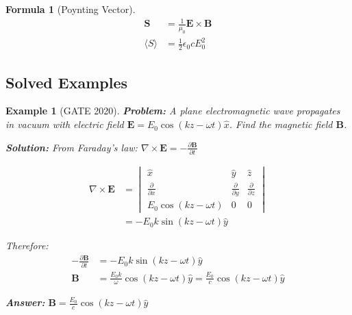 \documentclass[12pt,a4paper]{article}
\newtheorem{example}{Example}[section]
\newtheorem{formula}{Formula}[section]
\newcommand{\ans}[1]{\textcolor{red!70!black}{\textbf{Answer:} #1}}
\newcommand{\sol}{\textcolor{blue!70!black}{\textbf{Solution:}}}
\begin{document}
\begin{formula}[Poynting Vector]
\begin{align}
\mathbf{S} &= \frac{1}{\mu_0}\mathbf{E} \times \mathbf{B}\\
\langle S \rangle &= \frac{1}{2}\epsilon_0 c E_0^2
\end{align}
\end{formula}

\subsection{Solved Examples}

\begin{example}[GATE 2020]
\textbf{Problem:} A plane electromagnetic wave propagates in vacuum with electric field $\mathbf{E} = E_0 \cos(kz - \omega t)\hat{x}$. Find the magnetic field $\mathbf{B}$.

\sol
From Faraday's law: $\nabla \times \mathbf{E} = -\frac{\partial \mathbf{B}}{\partial t}$

\begin{align}
\nabla \times \mathbf{E} &= \begin{vmatrix}
\hat{x} & \hat{y} & \hat{z}\\
\frac{\partial}{\partial x} & \frac{\partial}{\partial y} & \frac{\partial}{\partial z}\\
E_0\cos(kz-\omega t) & 0 & 0
\end{vmatrix}\\
&= -E_0 k \sin(kz-\omega t)\hat{y}
\end{align}

Therefore:
\begin{align}
-\frac{\partial \mathbf{B}}{\partial t} &= -E_0 k \sin(kz-\omega t)\hat{y}\\
\mathbf{B} &= \frac{E_0 k}{\omega}\cos(kz-\omega t)\hat{y} = \frac{E_0}{c}\cos(kz-\omega t)\hat{y}
\end{align}

\ans{$\mathbf{B} = \frac{E_0}{c}\cos(kz-\omega t)\hat{y}$}
\end{example}
\end{document}
